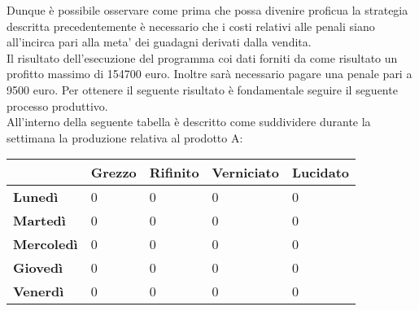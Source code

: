 \documentclass[12pt]{article}
\begin{document}
Dunque è possibile osservare come prima che possa divenire proficua la strategia descritta precedentemente è necessario che i costi relativi alle penali siano all'incirca pari alla meta' dei guadagni derivati dalla vendita.\\
Il risultato dell'esecuzione del programma coi dati forniti da come risultato un profitto massimo di 154700 euro. Inoltre sarà necessario pagare una penale pari a 9500 euro.
Per ottenere il seguente risultato è fondamentale seguire il seguente processo produttivo.\\
All'interno della seguente tabella è descritto come suddividere durante la settimana la produzione relativa al prodotto A:
\begin{table}[H]
	\centering
	\setlength{\tabcolsep}{15pt} %
	\renewcommand{\arraystretch}{2} %
	\begin{center}
		\begin{tabular}{|l|l|l|l|l|}
			\hline
			& \textbf{Grezzo} & \textbf{Rifinito} & \textbf{Verniciato} & \textbf{Lucidato} \\ \hline
			\textbf{Lunedì}    & 0               & 0                 & 0                   & 0                 \\ \hline
			\textbf{Martedì}   & 0               & 0              	 & 0                   & 0                 \\ \hline
			\textbf{Mercoledì} & 0             & 0                 & 0             & 0                 \\ \hline
			\textbf{Giovedì}   & 0               & 0              & 0                   & 0                 \\ \hline
			\textbf{Venerdì}   & 0               & 0                 & 0               & 0                 \\ \hline
		\end{tabular}
	\end{center}
\end{table}
\end{document}
